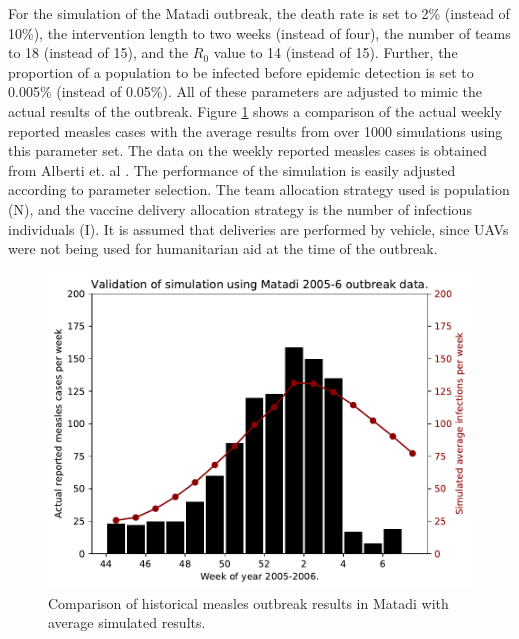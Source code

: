 For the simulation of the Matadi outbreak, the death rate is set to 2\% (instead of 10\%), the intervention length to two weeks (instead of four), the number of teams to 18 (instead of 15), and the $R_{0}$ value to 14 (instead of 15). Further, the proportion of a population to be infected before epidemic detection is set to 0.005\% (instead of 0.05\%). All of these parameters are adjusted to mimic the actual results of the outbreak. Figure \ref{res:matadi_valid} shows a comparison of the actual weekly reported measles cases with the average results from over 1000 simulations using this parameter set. The data on the weekly reported measles cases is obtained from Alberti et. al \cite{alberti2010reactive}. The performance of the simulation is easily adjusted according to parameter selection. The team allocation strategy used is population (N), and the vaccine delivery allocation strategy is the number of infectious individuals (I). It is assumed that deliveries are performed by vehicle, since UAVs were not being used for humanitarian aid at the time of the outbreak.

\begin{figure}[ht!]{\textwidth}
    \centering
    \includegraphics[width=\textwidth, trim={0 0 0 0.67cm},clip]{Matadi_updated.pdf}
    \caption{Comparison of historical measles outbreak results in Matadi with average simulated results.}
    \label{res:matadi_valid}
\end{figure}

